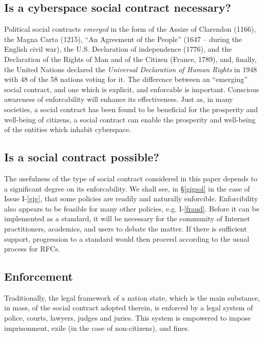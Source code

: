 \subsection{Is a cyberspace social contract necessary?}

Political social contracts {\em emerged}  
in the form of the Assize of Clarendon (1166), the Magna Carta (1215),  
``An Agreement of the People'' (1647 -- during the English civil war), the U.S.
Declaration of independence (1776), and the Declaration of the Rights of Man 
and of the Citizen (France, 1789), and, finally, the United Nations declared the {\em Universal Declaration
of Human Rights} in 1948 \cite{unhdr} with 48 of the 58 nations voting for it.
The difference between an ``emerging'' social contract, and one which is
explicit, and enforcable is important.  Conscious awareness of 
enforcability will enhance its effectiveness.
 Just as, in many societies, a social contract has been found to be beneficial for the prosperity and well-being of citizens, a social contract can enable the prosperity and well-being of the entities which inhabit cyberspace.

\subsection{Is a social contract possible?}

The usefulness of the type of social contract considered in this paper
depends to a significant degree on its enforcability. We shall see, in \S\ref{gigsol}
in the case of Issue I-\ref{gig},
that some policies are readily and naturally enforcible. Enforcibility also
appears to be feasible for many other policies, e.g. I-\ref{fraud}.
Before it can be implemented as a standard, it will be necessary
for the community of Internet practitioners, academics, and users to debate
the matter. If there is sufficient support, progression to a standard would then
proceed according to the usual process for RFCs.

\subsection{Enforcement}\label{enforcement}

Traditionally, the legal framework of a nation state, which is the main substance, 
in mass, of the social contract adopted therein, is enforced by a legal system of 
police, courts, lawyers, judges and juries. This system is empowered to impose
imprisonment, exile (in the case of non-citizens), and fines.

